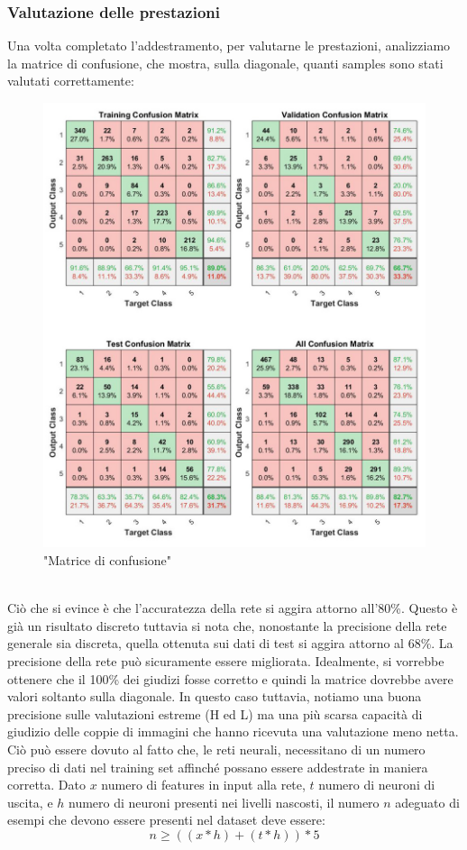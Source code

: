 \documentclass[a4paper,11pt]{article}
\begin{document}
    \subsubsection{Valutazione delle prestazioni}
    Una volta completato l'addestramento, per valutarne le prestazioni, analizziamo la matrice di confusione, che mostra, sulla diagonale, quanti samples sono stati valutati correttamente:
    \begin{figure}[h]
        \centering
        \includegraphics[scale=0.38]{confusion1}
        \caption{"Matrice di confusione"}
    \end{figure}
    \\Ciò che si evince è che l'accuratezza della rete si aggira attorno all'80\%. Questo è già un risultato discreto tuttavia si nota che, nonostante la precisione della rete generale sia discreta, quella ottenuta sui dati di test si aggira attorno al 68\%. 
    La precisione della rete può sicuramente essere migliorata. Idealmente, si vorrebbe ottenere che il 100\% dei giudizi fosse corretto e quindi
    la matrice dovrebbe avere valori soltanto sulla diagonale. In questo caso tuttavia, notiamo una buona precisione sulle valutazioni estreme (H ed L) ma una più scarsa capacità di giudizio delle coppie di immagini che hanno ricevuta una valutazione meno netta.
    Ciò può essere dovuto al fatto che, le reti neurali, necessitano di un numero preciso di dati nel training set affinché possano essere addestrate in maniera corretta.
    Dato $x$ numero di features in input alla rete, $t$ numero di neuroni di uscita, e $h$ numero di neuroni presenti nei livelli nascosti, il numero $n$ adeguato di esempi che devono essere presenti nel dataset deve essere:
    $$ n \geq ((x*h)+(t*h))*5 $$
\end{document}
